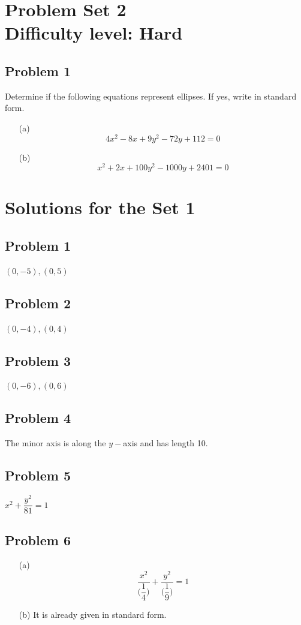 \documentclass[12pt]{article}
\begin{document}
\section*{Problem Set 2\\Difficulty level: Hard}
\subsection*{Problem 1}
Determine if the following equations represent ellipses. If yes, write in standard form.
\begin{enumerate}
    \item[(a)] \[4x^2-8x+9y^2-72y+112=0\]
    \item[(b)] \[x^2+2x+100y^2-1000y+2401=0\]
\end{enumerate}

\newpage
\section*{Solutions for the Set 1}
\subsection*{Problem 1}
\((0,-5),(0,5)\)
\subsection*{Problem 2}
\((0,-4),(0,4)\)
\subsection*{Problem 3}
\((0,-6),(0,6)\)
\subsection*{Problem 4}
The minor axis is along the \(y-\)axis and has length 10.
\subsection*{Problem 5}
\(x^2+\dfrac{y^2}{81}=1\)
\subsection*{Problem 6}
\begin{enumerate}
    \item[(a)] \[\dfrac{x^2}{\Big(\dfrac{1}{4}\Big)}+\dfrac{y^2}{\Big(\dfrac{1}{9}\Big)}=1\]
    \item[(b)] It is already given in standard form.
\end{enumerate}
\end{document}
